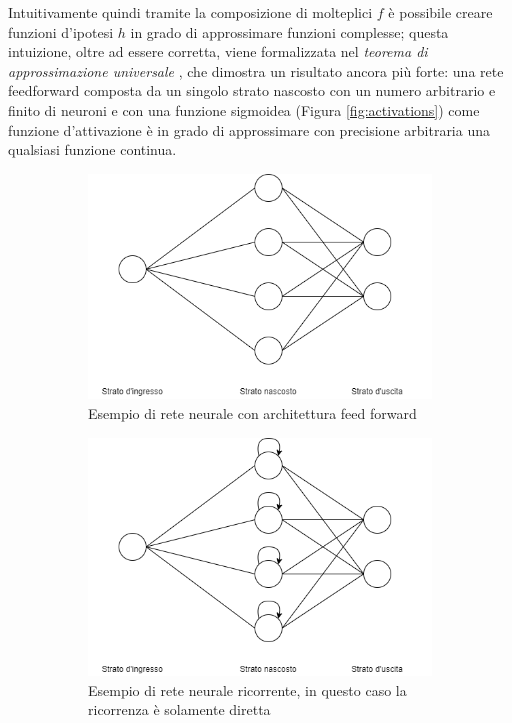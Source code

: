 \documentclass[../../main.tex]{subfiles}
\begin{document}
Intuitivamente quindi tramite la composizione di molteplici $f$ è possibile creare funzioni d'ipotesi $h$ in grado di approssimare funzioni complesse; questa intuizione, oltre ad essere corretta, viene formalizzata nel \textit{teorema di approssimazione universale} \cite{journals/mcss/Cybenko89}, che dimostra un risultato ancora più forte: una rete feedforward composta da un singolo strato nascosto con un numero arbitrario e finito di neuroni e con una funzione sigmoidea (Figura \ref{fig:activations}) come funzione d'attivazione è in grado di approssimare con precisione arbitraria una qualsiasi funzione continua.

\begin{figure}[H]
    \begin{subfigure}[]{0.48\textwidth}
        \centering
        \includegraphics[width = \textwidth]{immagini/4_2/feed_forward.png}
        \caption{Esempio di rete neurale con architettura feed forward}
        \label{fig:feedforward}        
    \end{subfigure}
    \begin{subfigure}[]{0.48\textwidth}
        \centering
        \includegraphics[width = \textwidth]{immagini/4_2/RNN.png}
        \caption{Esempio di rete neurale ricorrente, in questo caso la ricorrenza è solamente diretta}
        \label{fig:RNN}
    \end{subfigure}
    \caption{}
\end{figure}
\end{document}
